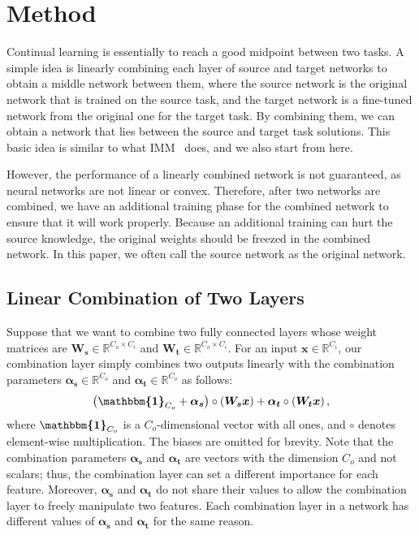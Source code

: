 \documentclass[letterpaper]{article}
\begin{document}
\section{Method}

Continual learning is essentially to reach a good midpoint between two tasks. A simple idea is linearly combining each layer of source and target networks to obtain a middle network between them, where the source network is the original network that is trained on the source task, and the target network is a fine-tuned network from the original one for the target task. By combining them, we can obtain a network that lies between the source and target task solutions. This basic idea is similar to what IMM~\cite{lee2017overcoming} does, and we also start from here.

However, the performance of a linearly combined network is not guaranteed, as neural networks are not linear or convex. Therefore, after two networks are combined, we have an additional training phase for the combined network to ensure that it will work properly. Because an additional training can hurt the source knowledge, the original weights should be freezed in the combined network. In this paper, we often call the source network as the original network.


\subsection{Linear Combination of Two Layers}

Suppose that we want to combine two fully connected layers whose weight matrices are $\bm{W_s} \in \mathbb{R}^{C_o \times C_i}$ and $\bm{W_t} \in \mathbb{R}^{C_o \times C_i}$. For an input $\bm{x} \in \mathbb{R}^{C_i}$, our combination layer simply combines two outputs linearly with the combination parameters $\bm{\alpha_s} \in \mathbb{R}^{C_o}$ and $\bm{\alpha_t} \in \mathbb{R}^{C_o}$ as follows:
\begin{equation}
\left(\bm{\mathbbm{1}}_{C_o}+\bm{\alpha_s}\right) \circ \left(\bm{W_s x}\right) + \bm{\alpha_t} \circ \left(\bm{W_t x}\right),
\label{eq:combine_fc}
\end{equation}
where $\bm{\mathbbm{1}}_{C_o}$ is a $C_o$-dimensional vector with all ones, and $\circ$ denotes element-wise multiplication. The biases are omitted for brevity. Note that the combination parameters $\bm{\alpha_s}$ and $\bm{\alpha_t}$ are vectors with the dimension $C_o$ and not scalars; thus, the combination layer can set a different importance for each feature. Moreover, $\bm{\alpha_s}$ and $\bm{\alpha_t}$ do not share their values to allow the combination layer to freely manipulate two features. Each combination layer in a network has different values of $\bm{\alpha_s}$ and $\bm{\alpha_t}$ for the same reason.
\end{document}
